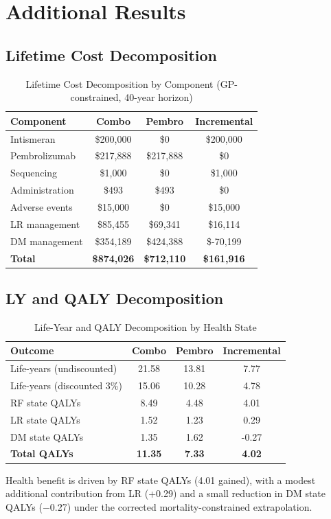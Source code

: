 \documentclass[11pt,a4paper]{article}
\begin{document}
\section{Additional Results}

\subsection{Lifetime Cost Decomposition}
\label{sec:cost_decomp}
\begin{table}[H]
\centering
\caption{Lifetime Cost Decomposition by Component (GP-constrained, 40-year horizon)}
\label{tab:s9}
\begin{tabular}{lccc}
\toprule
\textbf{Component} & \textbf{Combo} & \textbf{Pembro} & \textbf{Incremental} \\
\midrule
Intismeran & \$200,000 & \$0 & \$200,000 \\
Pembrolizumab & \$217,888 & \$217,888 & \$0 \\
Sequencing & \$1,000 & \$0 & \$1,000 \\
Administration & \$493 & \$493 & \$0 \\
Adverse events & \$15,000 & \$0 & \$15,000 \\
LR management & \$85,455 & \$69,341 & \$16,114 \\
DM management & \$354,189 & \$424,388 & \$-70,199 \\
\midrule
\textbf{Total} & \textbf{\$874,026} & \textbf{\$712,110} & \textbf{\$161,916} \\
\bottomrule
\end{tabular}
\end{table}

\subsection{LY and QALY Decomposition}
\label{sec:qaly_decomp}
\begin{table}[H]
\centering
\caption{Life-Year and QALY Decomposition by Health State}
\label{tab:s10}
\begin{tabular}{lccc}
\toprule
\textbf{Outcome} & \textbf{Combo} & \textbf{Pembro} & \textbf{Incremental} \\
\midrule
Life-years (undiscounted) & 21.58 & 13.81 & 7.77 \\
Life-years (discounted 3\%) & 15.06 & 10.28 & 4.78 \\
\midrule
RF state QALYs & 8.49 & 4.48 & 4.01 \\
LR state QALYs & 1.52 & 1.23 & 0.29 \\
DM state QALYs & 1.35 & 1.62 & -0.27 \\
\midrule
\textbf{Total QALYs} & \textbf{11.35} & \textbf{7.33} & \textbf{4.02} \\
\bottomrule
\end{tabular}
\end{table}
\noindent Health benefit is driven by RF state QALYs (4.01 gained), with a modest additional contribution from LR (+0.29) and a small reduction in DM state QALYs ($-$0.27) under the corrected mortality-constrained extrapolation.
\end{document}

